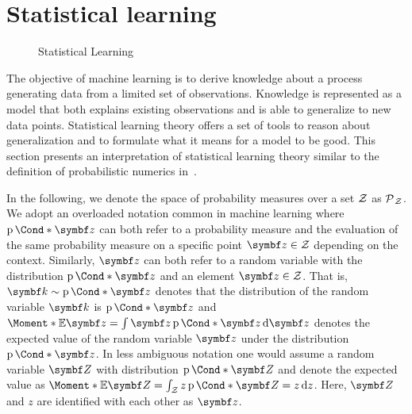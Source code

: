 \section{Statistical learning}
\begin{figure}[t]
    \centering
    \caption{
        Statistical Learning
        \label{fig:bayesian_ml:statistical_learning}
    }
\end{figure}
The objective of machine learning is to derive knowledge about a process generating data from a limited set of observations.
Knowledge is represented as a model that both explains existing observations and is able to generalize to new data points.
Statistical learning theory offers a set of tools to reason about generalization and to formulate what it means for a model to be good.
This section presents an interpretation of statistical learning theory similar to the definition of probabilistic numerics in~\parencite{oates_modern_2019,cockayne_bayesian_2019}.

In the following, we denote the space of probability measures over a set $\mathcal{Z}$ as $\operatorname{\mathcal{P}\mkern1mu}_{\mathcal{Z}}$.
We adopt an overloaded notation common in machine learning where $\Prob*{\mat{z}}$ can both refer to a probability measure and the evaluation of the same probability measure on a specific point $\mat{z} \in \Zc$ depending on the context.
Similarly, $\mat{z}$ can both refer to a random variable with the distribution $\Prob*{\mat{z}}$ and an element $\mat{z} \in \Zc$.
That is, $\mat{k} \sim \Prob*{\mat{z}}$ denotes that the distribution of the random variable $\mat{k}$ is $\Prob*{\mat{z}}$ and $\Moment*{\E}{\mat{z}} = \int \mat{z} \Prob*{\mat{z}} \diff \mat{z}$ denotes the expected value of the random variable $\mat{z}$ under the distribution $\Prob*{\mat{z}}$.
In less ambiguous notation one would assume a random variable $\mat{Z}$ with distribution $\Prob*{\mat{Z}}$ and denote the expected value as $\Moment*{\E}{\mat{Z}} = \int_{\Zc} z \Prob*{\mat{Z} = z} \diff z$.
Here, $\mat{Z}$ and $z$ are identified with each other as $\mat{z}$.


